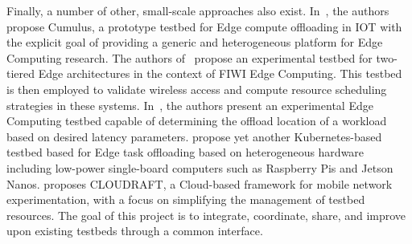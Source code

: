 Finally, a number of other, small-scale approaches also exist.
In~\cite{gedawy2016cumulus}, the authors propose Cumulus, a prototype testbed for Edge compute offloading in \gls{IOT} with the explicit goal of providing a generic and heterogeneous platform for Edge Computing research.
The authors of~\cite{rimal2018experimental} propose an experimental testbed for two-tiered Edge architectures in the context of \gls{FIWI} Edge Computing.
This testbed is then employed to validate wireless access and compute resource scheduling strategies in these systems.
In~\cite{yamanaka2021design}, the authors present an experimental Edge Computing testbed capable of determining the offload location of a workload based on desired latency parameters.
\cite{diao2019scalable} propose yet another Kubernetes-based testbed based for Edge task offloading based on heterogeneous hardware including low-power single-board computers such as Raspberry Pis and Jetson Nanos.\@
\cite{moorthy2022cloudraft} proposes \gls{CLOUDRAFT}, a Cloud-based framework for mobile network experimentation, with a focus on simplifying the management of testbed resources.
The goal of this project is to integrate, coordinate, share, and improve upon existing testbeds through a common interface.



